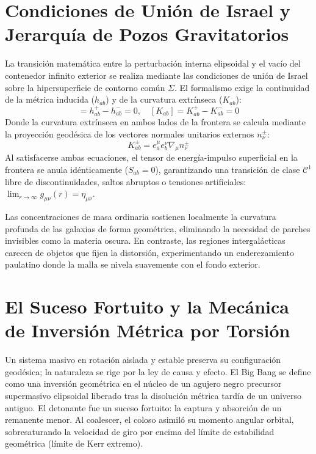 \documentclass[11pt,a4paper]{article}
\begin{document}
\section{Condiciones de Unión de Israel y Jerarquía de Pozos Gravitatorios}
La transición matemática entre la perturbación interna elipsoidal y el vacío del contenedor infinito exterior se realiza mediante las condiciones de unión de Israel sobre la hipersuperficie de contorno común $\Sigma$. El formalismo exige la continuidad de la métrica inducida ($h_{ab}$) y de la curvatura extrínseca ($K_{ab}$):
\begin{equation}
[h_{ab}] = h_{ab}^{+} - h_{ab}^{-} = 0, \quad [K_{ab}] = K_{ab}^{+} - K_{ab}^{-} = 0
\end{equation}
Donde la curvatura extrínseca en ambos lados de la frontera se calcula mediante la proyección geodésica de los vectores normales unitarios externos $n_\nu^{\pm}$:
\begin{equation}
K_{ab}^{\pm} = e^\mu_a e^\nu_b \nabla_\mu n_\nu^{\pm}
\end{equation}
Al satisfacerse ambas ecuaciones, el tensor de energía-impulso superficial en la frontera se anula idénticamente ($S_{ab} = 0$), garantizando una transición de clase $\mathcal{C}^1$ libre de discontinuidades, saltos abruptos o tensiones artificiales: $\lim_{r \to \infty} g_{\mu\nu}(r) = \eta_{\mu\nu}$. 

Las concentraciones de masa ordinaria sostienen localmente la curvatura profunda de las galaxias de forma geométrica, eliminando la necesidad de parches invisibles como la materia oscura. En contraste, las regiones intergalácticas carecen de objetos que fijen la distorsión, experimentando un enderezamiento paulatino donde la malla se nivela suavemente con el fondo exterior.

\section{El Suceso Fortuito y la Mecánica de Inversión Métrica por Torsión}
Un sistema masivo en rotación aislada y estable preserva su configuración geodésica; la naturaleza se rige por la ley de causa y efecto. El Big Bang se define como una inversión geométrica en el núcleo de un agujero negro precursor supermasivo elipsoidal liberado tras la disolución métrica tardía de un universo antiguo. El detonante fue un suceso fortuito: la captura y absorción de un remanente menor. Al coalescer, el coloso asimiló su momento angular orbital, sobresaturando la velocidad de giro por encima del límite de estabilidad geométrica (límite de Kerr extremo).
\end{document}
